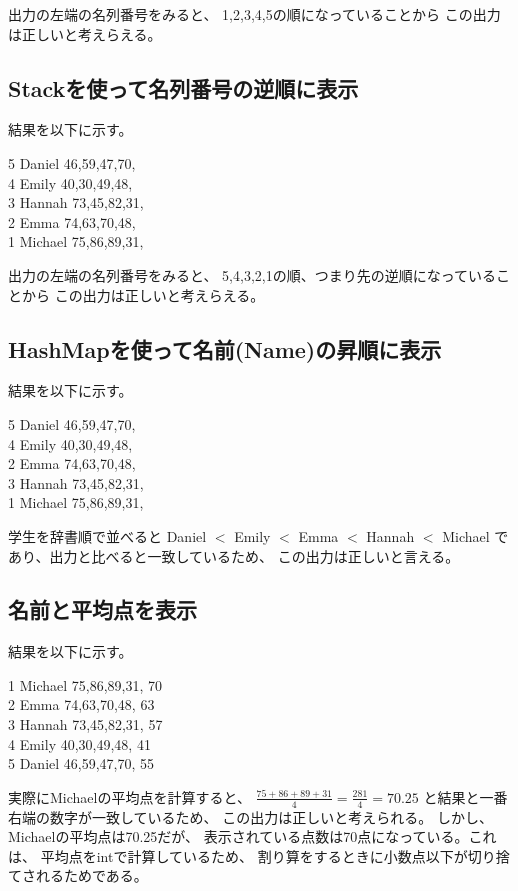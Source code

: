 \documentclass[dvipdfmx]{jsarticle}
\begin{document}
出力の左端の名列番号をみると、
1,2,3,4,5の順になっていることから
この出力は正しいと考えらえる。
\subsection{Stackを使って名列番号の逆順に表示}
結果を以下に示す。
\begin{screen}
  5    Daniel 46,59,47,70,\\
  4     Emily 40,30,49,48,\\
  3    Hannah 73,45,82,31,\\
  2      Emma 74,63,70,48,\\
  1   Michael 75,86,89,31,
\end{screen}

出力の左端の名列番号をみると、
5,4,3,2,1の順、つまり先の逆順になっていることから
この出力は正しいと考えらえる。

\subsection{HashMapを使って名前(Name)の昇順に表示}
結果を以下に示す。
\begin{screen}
  5    Daniel 46,59,47,70,\\
  4     Emily 40,30,49,48,\\
  2      Emma 74,63,70,48,\\
  3    Hannah 73,45,82,31,\\
  1   Michael 75,86,89,31,
\end{screen}

学生を辞書順で並べると
Daniel $<$ Emily $<$ Emma $<$ Hannah $<$ Michael
であり、出力と比べると一致しているため、
この出力は正しいと言える。

\subsection{名前と平均点を表示}
結果を以下に示す。 
\begin{screen}
  1   Michael 75,86,89,31, 70\\
  2      Emma 74,63,70,48, 63\\
  3    Hannah 73,45,82,31, 57\\
  4     Emily 40,30,49,48, 41\\
  5    Daniel 46,59,47,70, 55
\end{screen}

実際にMichaelの平均点を計算すると、
$\displaystyle \frac{75+86+89+31}{4} = \frac{281}{4} = 70.25$
と結果と一番右端の数字が一致しているため、
この出力は正しいと考えられる。
しかし、Michaelの平均点は70.25だが、
表示されている点数は70点になっている。これは、
平均点をintで計算しているため、
割り算をするときに小数点以下が切り捨てされるためである。
\end{document}
